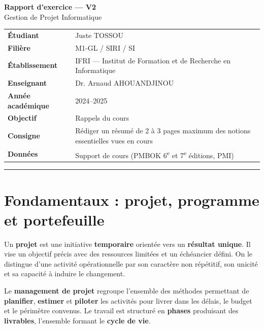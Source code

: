 \documentclass[11pt,a4paper]{article}
\newcommand{\metarow}[2]{#1 & #2 \\}
\begin{document}
\begin{center}
    \colorbox{ifriblue}{\parbox{\dimexpr\textwidth-2\fboxsep}{
        \centering
        \color{white}
        \vspace{0.5em}
        {\LARGE \textbf{Rapport d'exercice --- V2}}\\[0.35em]
        {\large Gestion de Projet Informatique}
        \vspace{0.5em}
    }}
\end{center}

\vspace{0.8em}

\noindent
\begin{tabularx}{\textwidth}{|>{\bfseries}l|X|}
    \hline
    \rowcolor{ifrigray}
    \metarow{Étudiant}{Juste TOSSOU}
    \metarow{Filière}{M1-GL / SIRI / SI}
    \metarow{Établissement}{IFRI --- Institut de Formation et de Recherche en Informatique}
    \metarow{Enseignant}{Dr. Arnaud AHOUANDJINOU}
    \metarow{Année académique}{2024--2025}
    \metarow{Objectif}{Rappels du cours}
    \metarow{Consigne}{Rédiger un résumé de 2 à 3 pages maximum des notions essentielles vues en cours}
    \metarow{Données}{Support de cours (PMBOK\textsuperscript{\textregistered} 6\textsuperscript{e} et 7\textsuperscript{e} éditions, PMI)}
    \hline
\end{tabularx}

\vspace{0.8em}
\hrule
\vspace{0.6em}


\section{Fondamentaux : projet, programme et portefeuille}

Un \textbf{projet} est une initiative \textbf{temporaire} orientée vers un \textbf{résultat unique}. Il vise un objectif précis avec des ressources limitées et un échéancier défini. On le distingue d'une activité opérationnelle par son caractère non répétitif, son unicité et sa capacité à induire le changement.

Le \textbf{management de projet} regroupe l'ensemble des méthodes permettant de \textbf{planifier}, \textbf{estimer} et \textbf{piloter} les activités pour livrer dans les délais, le budget et le périmètre convenus. Le travail est structuré en \textbf{phases} produisant des \textbf{livrables}, l'ensemble formant le \textbf{cycle de vie}.
\end{document}
